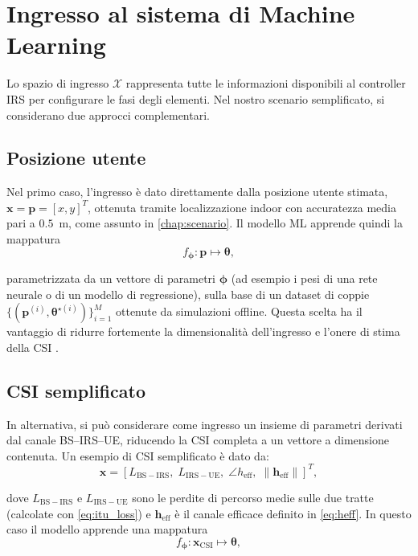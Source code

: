 \documentclass[12pt,a4paper]{report}
\begin{document}
\section{Ingresso al sistema di Machine Learning}
Lo spazio di ingresso $\mathcal{X}$ rappresenta tutte le informazioni
disponibili al controller IRS per configurare le fasi degli elementi.
Nel nostro scenario semplificato, si considerano due approcci complementari.

\subsection{Posizione utente}
Nel primo caso, l'ingresso è dato direttamente dalla posizione utente
stimata, $\mathbf{x} = \mathbf{p} = [x, y]^T$, ottenuta tramite
localizzazione indoor con accuratezza media pari a $0.5$~m, come
assunto in \cref{chap:scenario}. Il modello ML apprende quindi la mappatura
\begin{equation}
  f_{\boldsymbol{\phi}} : \mathbf{p} \mapsto \boldsymbol{\theta},
\end{equation}

parametrizzata da un vettore di parametri $\boldsymbol{\phi}$ (ad
esempio i pesi di una rete neurale o di un modello di regressione),
sulla base di un dataset di coppie $\{(\mathbf{p}^{(i)},
\boldsymbol{\theta}^{\star (i)})\}_{i=1}^M$ ottenute da simulazioni
offline. Questa scelta ha il vantaggio di ridurre fortemente la
dimensionalità dell'ingresso e l'onere di stima della CSI \cite{piroddi2023irs}.

\subsection{CSI semplificato}
In alternativa, si può considerare come ingresso un insieme di
parametri derivati dal canale BS--IRS--UE, riducendo la CSI completa
a un vettore a dimensione contenuta. Un esempio di CSI semplificato è dato da:
\begin{equation}
  \mathbf{x} =
  \left[
    L_{\mathrm{BS-IRS}},\;
    L_{\mathrm{IRS-UE}},\;
    \angle h_{\mathrm{eff}},\;
    \|\mathbf{h}_{\mathrm{eff}}\|
  \right]^T,
\end{equation}

dove $L_{\mathrm{BS-IRS}}$ e $L_{\mathrm{IRS-UE}}$ sono le perdite di
percorso medie sulle due tratte (calcolate con \eqref{eq:itu_loss}) e
$\mathbf{h}_{\mathrm{eff}}$ è il canale efficace definito in
\eqref{eq:heff}. In questo caso il modello apprende una mappatura
\begin{equation}
  f_{\boldsymbol{\phi}} : \mathbf{x}_{\mathrm{CSI}} \mapsto \boldsymbol{\theta},
\end{equation}
\end{document}
